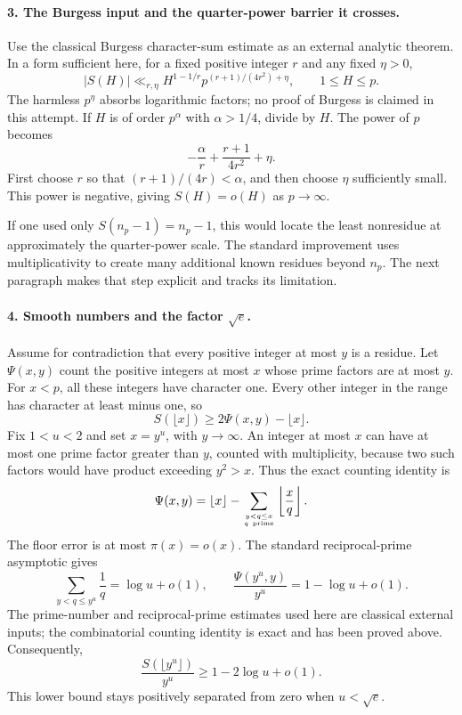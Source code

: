 \documentclass[11pt]{article}
\begin{document}
\paragraph{3. The Burgess input and the quarter-power barrier it crosses.}
Use the classical Burgess character-sum estimate as an external analytic theorem. In a form sufficient here, for a fixed positive integer $r$ and any fixed $\eta>0$,
\[
 |S(H)|\ll_{r,\eta}
 H^{1-1/r}p^{(r+1)/(4r^2)+\eta},\qquad 1\le H\le p.
\]
The harmless $p^\eta$ absorbs logarithmic factors; no proof of Burgess is claimed in this attempt. If $H$ is of order $p^\alpha$ with $\alpha>1/4$, divide by $H$. The power of $p$ becomes
\[
 -\frac\alpha r+\frac{r+1}{4r^2}+\eta.
\]
First choose $r$ so that $(r+1)/(4r)<\alpha$, and then choose $\eta$ sufficiently small. This power is negative, giving $S(H)=o(H)$ as $p\to\infty$.

If one used only $S(n_p-1)=n_p-1$, this would locate the least nonresidue at approximately the quarter-power scale. The standard improvement uses multiplicativity to create many additional known residues beyond $n_p$. The next paragraph makes that step explicit and tracks its limitation.

\paragraph{4. Smooth numbers and the factor $\sqrt e$.}
Assume for contradiction that every positive integer at most $y$ is a residue. Let $\Psi(x,y)$ count the positive integers at most $x$ whose prime factors are at most $y$. For $x<p$, all these integers have character one. Every other integer in the range has character at least minus one, so
\[
 S(\lfloor x\rfloor)\ge2\Psi(x,y)-\lfloor x\rfloor.
\]
Fix $1<u<2$ and set $x=y^u$, with $y\to\infty$. An integer at most $x$ can have at most one prime factor greater than $y$, counted with multiplicity, because two such factors would have product exceeding $y^2>x$. Thus the exact counting identity is
\[
 \Psi(x,y)=\lfloor x\rfloor-
      \sum_{y<q\le x\atop q\ \mathrm{prime}}\left\lfloor\frac{x}{q}\right\rfloor.
\]
The floor error is at most $\pi(x)=o(x)$. The standard reciprocal-prime asymptotic gives
\[
 \sum_{y<q\le y^u}\frac1q=\log u+o(1),
 \qquad \frac{\Psi(y^u,y)}{y^u}=1-\log u+o(1).
\]
The prime-number and reciprocal-prime estimates used here are classical external inputs; the combinatorial counting identity is exact and has been proved above. Consequently,
\[
 \frac{S(\lfloor y^u\rfloor)}{y^u}
 \ge1-2\log u+o(1).
\]
This lower bound stays positively separated from zero when $u<\sqrt e$.
\end{document}
